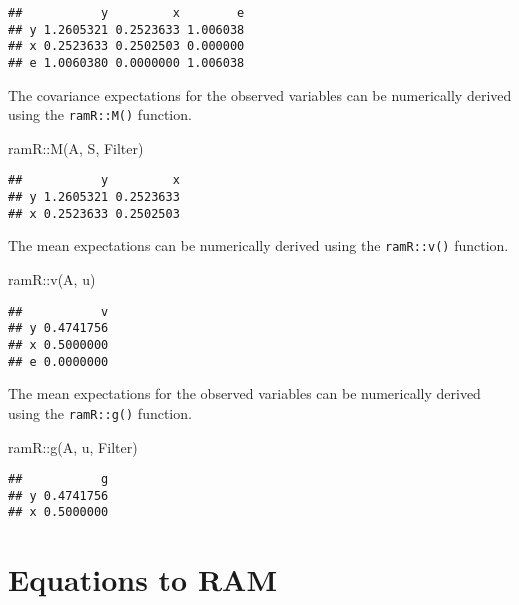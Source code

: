 \documentclass[
]{book}
\newenvironment{Shaded}{\begin{snugshade}}{\end{snugshade}}
\newcommand{\FunctionTok}[1]{\textcolor[rgb]{0.00,0.00,0.00}{#1}}
\newcommand{\NormalTok}[1]{#1}
\newcommand{\SpecialCharTok}[1]{\textcolor[rgb]{0.00,0.00,0.00}{#1}}
\theoremstyle{definition}
\theoremstyle{definition}
\theoremstyle{definition}
\theoremstyle{remark}
\begin{document}
\begin{verbatim}
##           y         x        e
## y 1.2605321 0.2523633 1.006038
## x 0.2523633 0.2502503 0.000000
## e 1.0060380 0.0000000 1.006038
\end{verbatim}

The covariance expectations for the observed variables
can be numerically derived using the \texttt{ramR::M()} function.

\begin{Shaded}
\begin{Highlighting}[]
\NormalTok{ramR}\SpecialCharTok{::}\FunctionTok{M}\NormalTok{(A, S, Filter)}
\end{Highlighting}
\end{Shaded}

\begin{verbatim}
##           y         x
## y 1.2605321 0.2523633
## x 0.2523633 0.2502503
\end{verbatim}

The mean expectations
can be numerically derived using the \texttt{ramR::v()} function.

\begin{Shaded}
\begin{Highlighting}[]
\NormalTok{ramR}\SpecialCharTok{::}\FunctionTok{v}\NormalTok{(A, u)}
\end{Highlighting}
\end{Shaded}

\begin{verbatim}
##           v
## y 0.4741756
## x 0.5000000
## e 0.0000000
\end{verbatim}

The mean expectations for the observed variables
can be numerically derived using the \texttt{ramR::g()} function.

\begin{Shaded}
\begin{Highlighting}[]
\NormalTok{ramR}\SpecialCharTok{::}\FunctionTok{g}\NormalTok{(A, u, Filter)}
\end{Highlighting}
\end{Shaded}

\begin{verbatim}
##           g
## y 0.4741756
## x 0.5000000
\end{verbatim}

\hypertarget{equations-to-ram}{%
\section{Equations to RAM}\label{equations-to-ram}}
\end{document}
